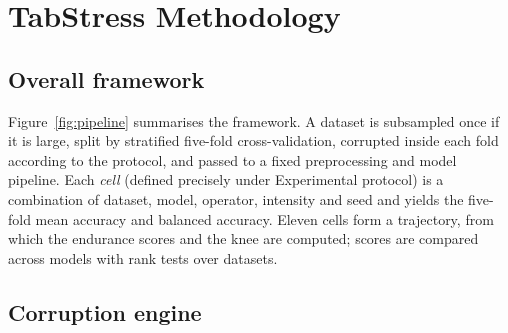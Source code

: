 \documentclass[pdflatex,sn-mathphys]{sn-jnl}
\theoremstyle{thmstyleone}
\theoremstyle{thmstyletwo}
\theoremstyle{thmstylethree}
\begin{document}
\section{TabStress Methodology}\label{sec:method}

\subsection{Overall framework}\label{sec:method:framework}

Figure~\ref{fig:pipeline} summarises the framework. A dataset is subsampled once if it is large, split by stratified five-fold cross-validation, corrupted inside each fold according to the protocol, and passed to a fixed preprocessing and model pipeline. Each \emph{cell} (defined precisely under Experimental protocol) is a combination of dataset, model, operator, intensity and seed and yields the five-fold mean accuracy and balanced accuracy. Eleven cells form a trajectory, from which the endurance scores and the knee are computed; scores are compared across models with rank tests over datasets.



\subsection{Corruption engine}\label{sec:method:engine}
\end{document}
